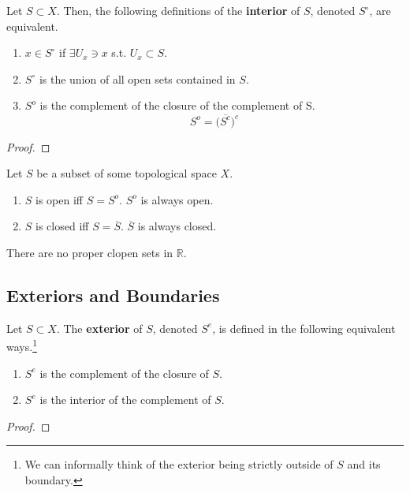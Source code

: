   \begin{definition}[Interior]
    Let $S \subset X$. Then, the following definitions of the \textbf{interior} of $S$, denoted $S^\circ$, are equivalent. 
    \begin{enumerate}
      \item $x \in S^\circ$ if $\exists U_x \ni x$ s.t. $U_x \subset S$. 
      \item $S^\circ$ is the union of all open sets contained in $S$. 
      \item $S^{o}$ is the complement of the closure of the complement of S. 
      \begin{equation}
        S^{o} = \big(\overline{S^{c}}\big)^{c}
      \end{equation}
    \end{enumerate}
  \end{definition}
  \begin{proof}
    
  \end{proof}

  \begin{lemma}
    Let $S$ be a subset of some topological space $X$. 
    \begin{enumerate}
      \item $S$ is open iff $S = S^{o}$. $S^{o}$ is always open.
      \item $S$ is closed iff $S = \overline{S}$. $\overline{S}$ is always closed. 
    \end{enumerate}
  \end{lemma}

  \begin{theorem}
    There are no proper clopen sets in $\mathbb{R}$. 
  \end{theorem}

\subsection{Exteriors and Boundaries}

  \begin{definition}[Exteriors]
    Let $S \subset X$. The \textbf{exterior} of $S$, denoted $S^e$, is defined in the following equivalent ways.\footnote{We can informally think of the exterior being strictly outside of $S$ and its boundary.}
    \begin{enumerate}
      \item $S^e$ is the complement of the closure of $S$. 
      \item $S^e$ is the interior of the complement of $S$. 
    \end{enumerate}
  \end{definition}
  \begin{proof}
    
  \end{proof}

